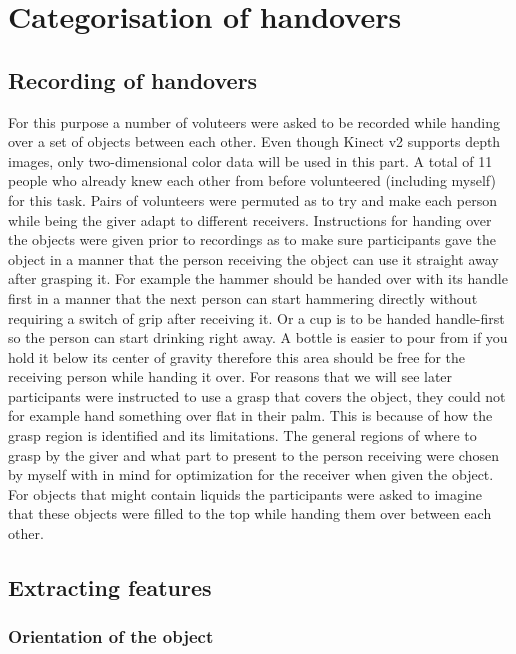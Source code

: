 \section{Categorisation of handovers}

\subsection{Recording of handovers}

For this purpose a number of voluteers were asked to be recorded while handing over a set of objects between each other. Even though Kinect v2 supports depth images, only two-dimensional color data will be used in this part. A total of 11 people who already knew each other from before volunteered (including myself) for this task. Pairs of volunteers were permuted as to try and make each person while being the giver adapt to different receivers. Instructions for handing over the objects were given prior to recordings as to make sure participants gave the object in a manner that the person receiving the object can use it straight away after grasping it. For example the hammer should be handed over with its handle first in a manner that the next person can start hammering directly without requiring a switch of grip after receiving it. Or a cup is to be handed handle-first so the person can start drinking right away. A bottle is easier to pour from if you hold it below its center of gravity therefore this area should be free for the receiving person while handing it over. For reasons that we will see later participants were instructed to use a grasp that covers the object, they could not for example hand something over flat in their palm. This is because of how the grasp region is identified and its limitations. The general regions of where to grasp by the giver and what part to present to the person receiving were chosen by myself with in mind for optimization for the receiver when given the object. For objects that might contain liquids the participants were asked to imagine that these objects were filled to the top while handing them over between each other.

\subsection{Extracting features}


\subsubsection{Orientation of the object}

